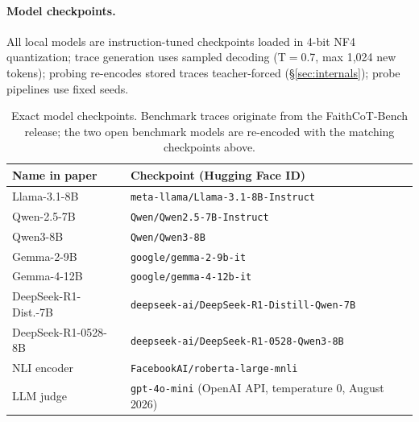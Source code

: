 \documentclass{article}
\begin{document}
\paragraph{Model checkpoints.} All local models are instruction-tuned checkpoints loaded in 4-bit NF4 quantization; trace generation uses sampled decoding (T$=$0.7, max 1{,}024 new tokens); probing re-encodes stored traces teacher-forced (\S\ref{sec:internals}); probe pipelines use fixed seeds.
\begin{table}[h]
\centering
\small
\begin{tabular}{@{}ll@{}}
\toprule
\textbf{Name in paper} & \textbf{Checkpoint (Hugging Face ID)} \\
\midrule
Llama-3.1-8B & \texttt{meta-llama/Llama-3.1-8B-Instruct} \\
Qwen-2.5-7B & \texttt{Qwen/Qwen2.5-7B-Instruct} \\
Qwen3-8B & \texttt{Qwen/Qwen3-8B} \\
Gemma-2-9B & \texttt{google/gemma-2-9b-it} \\
Gemma-4-12B & \texttt{google/gemma-4-12b-it} \\
DeepSeek-R1-Dist.-7B & \texttt{deepseek-ai/DeepSeek-R1-Distill-Qwen-7B} \\
DeepSeek-R1-0528-8B & \texttt{deepseek-ai/DeepSeek-R1-0528-Qwen3-8B} \\
NLI encoder & \texttt{FacebookAI/roberta-large-mnli} \\
LLM judge & \texttt{gpt-4o-mini} (OpenAI API, temperature 0, August 2026) \\
\bottomrule
\end{tabular}
\caption{Exact model checkpoints. Benchmark traces originate from the FaithCoT-Bench release; the two open benchmark models are re-encoded with the matching checkpoints above.}
\label{tab:checkpoints}
\end{table}
\end{document}
